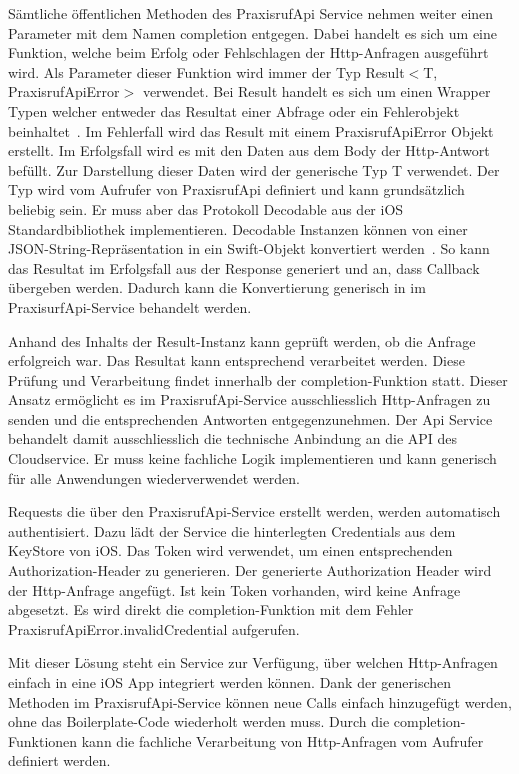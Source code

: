 Sämtliche öffentlichen Methoden des PraxisrufApi Service nehmen weiter einen Parameter mit dem Namen completion entgegen.
Dabei handelt es sich um eine Funktion, welche beim Erfolg oder Fehlschlagen der Http-Anfragen ausgeführt wird.
Als Parameter dieser Funktion wird immer der Typ Result$<$T, PraxisrufApiError$>$ verwendet.
Bei Result handelt es sich um einen Wrapper Typen welcher entweder das Resultat einer Abfrage oder ein Fehlerobjekt beinhaltet~\cite{ios_result}.
Im Fehlerfall wird das Result mit einem PraxisrufApiError Objekt erstellt.
Im Erfolgsfall wird es mit den Daten aus dem Body der Http-Antwort befüllt.
Zur Darstellung dieser Daten wird der generische Typ T verwendet.
Der Typ wird vom Aufrufer von PraxisrufApi definiert und kann grundsätzlich beliebig sein.
Er muss aber das Protokoll Decodable aus der iOS Standardbibliothek implementieren.
Decodable Instanzen können von einer JSON-String-Repräsentation in ein Swift-Objekt konvertiert werden~\cite{ios_decodable}.
So kann das Resultat im Erfolgsfall aus der Response generiert und an, dass Callback übergeben werden.
Dadurch kann die Konvertierung generisch in im PraxisurfApi-Service behandelt werden.

Anhand des Inhalts der Result-Instanz kann geprüft werden, ob die Anfrage erfolgreich war.
Das Resultat kann entsprechend verarbeitet werden.
Diese Prüfung und Verarbeitung findet innerhalb der completion-Funktion statt.
Dieser Ansatz ermöglicht es im PraxisrufApi-Service ausschliesslich Http-Anfragen zu senden und die entsprechenden Antworten entgegenzunehmen.
Der Api Service behandelt damit ausschliesslich die technische Anbindung an die API des Cloudservice.
Er muss keine fachliche Logik implementieren und kann generisch für alle Anwendungen wiederverwendet werden.

Requests die über den PraxisrufApi-Service erstellt werden, werden automatisch authentisiert.
Dazu lädt der Service die hinterlegten Credentials aus dem KeyStore von iOS.
Das Token wird verwendet, um einen entsprechenden Authorization-Header zu generieren.
Der generierte Authorization Header wird der Http-Anfrage angefügt.
Ist kein Token vorhanden, wird keine Anfrage abgesetzt.
Es wird direkt die completion-Funktion mit dem Fehler PraxisrufApiError.invalidCredential aufgerufen.

Mit dieser Lösung steht ein Service zur Verfügung, über welchen Http-Anfragen einfach in eine iOS App integriert werden können.
Dank der generischen Methoden im PraxisrufApi-Service können neue Calls einfach hinzugefügt werden, ohne das Boilerplate-Code wiederholt werden muss.
Durch die completion-Funktionen kann die fachliche Verarbeitung von Http-Anfragen vom Aufrufer definiert werden.

